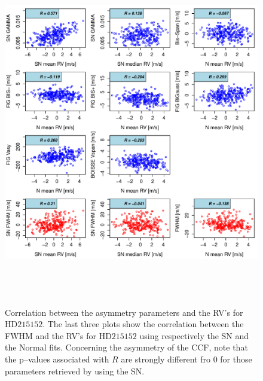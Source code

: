 \documentclass{aa}
\begin{document}
\begin{figure}[htbp]
\begin{center}
\includegraphics[height = 6in]{HD21515_[4]Comparison_para.pdf}  
   \caption{Correlation between the asymmetry parameters and the RV's for $\text{HD}215152$. The last three plots show the correlation between the FWHM and the RV's for $\text{HD}215152$ using respectively the SN and the Normal fits. Concerning the asymmetry of the CCF, note that the p--values associated with $R$ are strongly different fro $0$ for those parameters retrieved by using the SN.}
   \label{fig:HD215152:corrPlot}
\end{center}
\end{figure}
\end{document}
